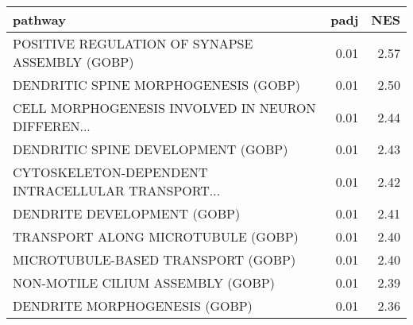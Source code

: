 \begin{tabular}{lrr}
\toprule
                                           pathway &  padj &   NES \\
\midrule
    POSITIVE REGULATION OF SYNAPSE ASSEMBLY (GOBP) &  0.01 &  2.57 \\
              DENDRITIC SPINE MORPHOGENESIS (GOBP) &  0.01 &  2.50 \\
 CELL MORPHOGENESIS INVOLVED IN NEURON DIFFEREN... &  0.01 &  2.44 \\
                DENDRITIC SPINE DEVELOPMENT (GOBP) &  0.01 &  2.43 \\
 CYTOSKELETON-DEPENDENT INTRACELLULAR TRANSPORT... &  0.01 &  2.42 \\
                       DENDRITE DEVELOPMENT (GOBP) &  0.01 &  2.41 \\
                TRANSPORT ALONG MICROTUBULE (GOBP) &  0.01 &  2.40 \\
                MICROTUBULE-BASED TRANSPORT (GOBP) &  0.01 &  2.40 \\
                 NON-MOTILE CILIUM ASSEMBLY (GOBP) &  0.01 &  2.39 \\
                     DENDRITE MORPHOGENESIS (GOBP) &  0.01 &  2.36 \\
\bottomrule
\end{tabular}

